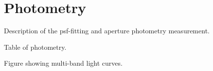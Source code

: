 \section{Photometry}\label{sec:Photometry}

Description of the psf-fitting and aperture photometry measurement. 

Table of photometry.

Figure showing multi-band light curves.